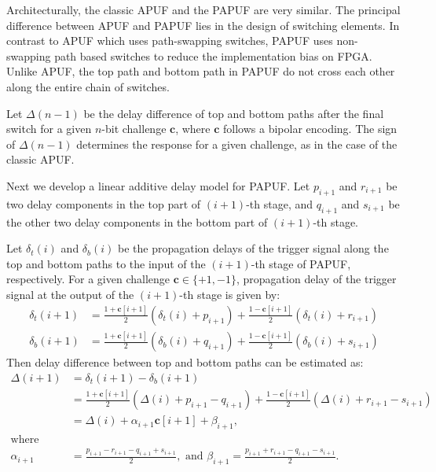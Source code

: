 \documentclass{article}
\newcommand{\vect}[1]{\mathbf{#1}}
\begin{document}
\begin{questions}
\begin{enumerate}
\end{enumerate}
{\color{blue}
Architecturally, the classic APUF and the PAPUF are very similar.
The principal difference between APUF and PAPUF lies in the design of switching elements.  In contrast to APUF which uses path-swapping switches, 
PAPUF uses non-swapping path based switches to reduce the implementation 
bias on FPGA. 
Unlike APUF, the top path and bottom path 
in PAPUF do not cross each other along the entire chain of switches. 

Let $\Delta(n-1)$ be the delay difference of top and bottom paths 
after the final switch for a given $n$-bit challenge $\vect{c}$, 
where $\vect{c}$ follows a bipolar encoding. 
The sign of $\Delta(n-1)$ determines the response for a given challenge,
as in the case of the classic APUF.

Next we develop a linear additive delay model for PAPUF. 
Let $p_{i+1}$ and $r_{i+1}$ be two delay components in the top part of $(i+1)$-th stage, and $q_{i+1}$ and 
$s_{i+1}$ be the other two delay components in the bottom part of $(i+1)$-th stage. %

Let $\delta_t(i)$ and $\delta_b(i)$ be the propagation delays 
of the trigger signal along the top and bottom paths to the input of 
the $(i+1)$-th stage of PAPUF, respectively. For a 
given challenge $\vect{c} \in \{+1,-1\}$, propagation delay of the trigger signal at 
the output of the $(i+1)$-th stage is given by:
%
\begin{align*}
\delta_t(i+1) &= \frac{1+\vect{c}[i+1]}{2}(\delta_t(i) + p_{i+1})  %
              + \frac{1-\vect{c}[i+1]}{2}(\delta_t(i) + r_{i+1}) \\ \nonumber
\delta_b(i+1) &= \frac{1+\vect{c}[i+1]}{2}(\delta_b(i) + q_{i+1})  %
              + \frac{1-\vect{c}[i+1]}{2}(\delta_b(i) + s_{i+1}) 
\end{align*}
Then delay difference between top and bottom paths can be estimated as: 
\begin{align}\label{eq:pdl-apuf-delay-diff}
\Delta(i+1) &= \delta_t(i+1) - \delta_b(i+1) \\ \nonumber
            &= \frac{1+\vect{c}[i+1]}{2} (\Delta(i) + p_{i+1} - q_{i+1}) 
            + \frac{1-\vect{c}[i+1]}{2}(\Delta(i) + r_{i+1} - s_{i+1}) \\ \nonumber
            &= \Delta(i) + \alpha_{i+1}\vect{c}[i+1] + \beta_{i+1},  \\ \nonumber 
\mbox{where}\quad\quad & \\ \nonumber 
\alpha_{i+1} &= \frac{p_{i+1} - r_{i+1} - q_{i+1} + s_{i+1} }{2}, \text{ and }
\beta_{i+1}  = \frac{p_{i+1} + r_{i+1} - q_{i+1} - s_{i+1} }{2}.  \nonumber 
\end{align}


}
\end{questions}
\end{document}
